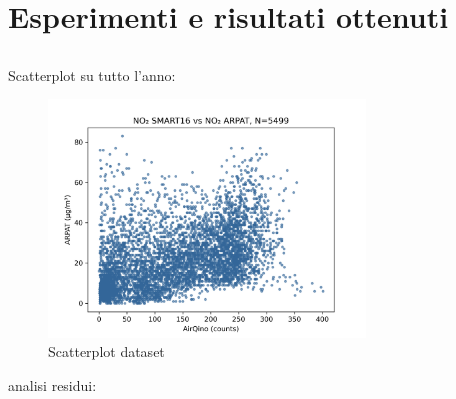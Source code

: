 \section{Esperimenti e risultati ottenuti}\label{sec:esperimenti}









\subsection{}\label{ssec:risultati-no2}

Scatterplot su tutto l'anno:

\begin{figure}[H]
\centering
\includegraphics[width=0.75\textwidth,height=\textheight,keepaspectratio]{img/sc_no2.png}
\caption{Scatterplot dataset }
\label{fig:scatterplot_no2}
\end{figure}

analisi residui:

